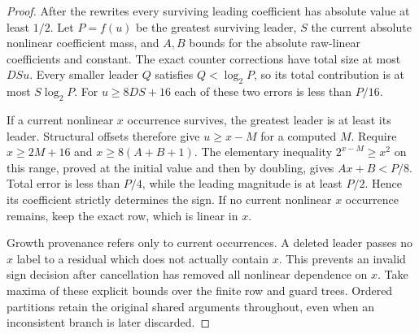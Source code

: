 \documentclass[11pt]{article}
\begin{document}
\begin{proof}
After the rewrites every surviving leading coefficient has absolute value
at least $1/2$. Let $P=f(u)$ be the greatest surviving leader, $S$ the
current absolute nonlinear coefficient mass, and $A,B$ bounds for the
absolute raw-linear coefficients and constant. The exact counter
corrections have total size at most $DSu$. Every smaller leader $Q$
satisfies $Q<\log_2 P$, so its total contribution is at most
$S\log_2P$. For $u\ge8DS+16$ each of these two errors is less than $P/16$.

If a current nonlinear $x$ occurrence survives, the greatest leader is
at least its leader. Structural offsets therefore give $u\ge x-M$ for a
computed $M$. Require $x\ge2M+16$ and $x\ge8(A+B+1)$. The elementary
inequality $2^{x-M}\ge x^2$ on this range, proved at the initial value
and then by doubling, gives $Ax+B<P/8$. Total error is less than $P/4$,
while the leading magnitude is at least $P/2$. Hence its coefficient
strictly determines the sign. If no current nonlinear $x$ occurrence
remains, keep the exact row, which is linear in $x$.

Growth provenance refers only to current occurrences. A deleted leader
passes no $x$ label to a residual which does not actually contain $x$.
This prevents an invalid sign decision after cancellation has removed all
nonlinear dependence on $x$. Take maxima of these explicit bounds over the
finite row and guard trees. Ordered partitions retain the original shared
arguments throughout, even when an inconsistent branch is later discarded.
\end{proof}
\end{document}
